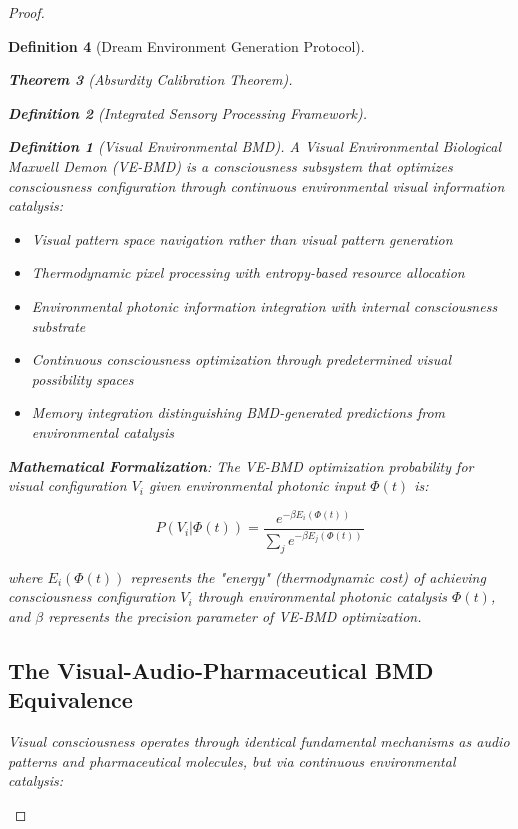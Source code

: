 \documentclass[12pt,a4paper]{article}
\newtheorem{theorem}{Theorem}[section]
\newtheorem{definition}[theorem]{Definition}
\begin{document}
\begin{proof}
\begin{definition}[Dream Environment Generation Protocol]
\begin{theorem}[Absurdity Calibration Theorem]
\begin{observation}
\begin{definition}[Integrated Sensory Processing Framework]
\begin{definition}[Visual Environmental BMD]
A Visual Environmental Biological Maxwell Demon (VE-BMD) is a consciousness subsystem that optimizes consciousness configuration through continuous environmental visual information catalysis:
\begin{itemize}
\item Visual pattern space navigation rather than visual pattern generation
\item Thermodynamic pixel processing with entropy-based resource allocation
\item Environmental photonic information integration with internal consciousness substrate
\item Continuous consciousness optimization through predetermined visual possibility spaces
\item Memory integration distinguishing BMD-generated predictions from environmental catalysis
\end{itemize}
\end{definition}

\textbf{Mathematical Formalization}:
The VE-BMD optimization probability for visual configuration $V_i$ given environmental photonic input $\Phi(t)$ is:

$$P(V_i | \Phi(t)) = \frac{e^{-\beta E_i(\Phi(t))}}{\sum_j e^{-\beta E_j(\Phi(t))}}$$

where $E_i(\Phi(t))$ represents the "energy" (thermodynamic cost) of achieving consciousness configuration $V_i$ through environmental photonic catalysis $\Phi(t)$, and $\beta$ represents the precision parameter of VE-BMD optimization.

\subsection{The Visual-Audio-Pharmaceutical BMD Equivalence}

Visual consciousness operates through identical fundamental mechanisms as audio patterns and pharmaceutical molecules, but via continuous environmental catalysis:


\end{definition}
\end{observation}
\end{theorem}
\end{definition}
\end{proof}
\end{document}
